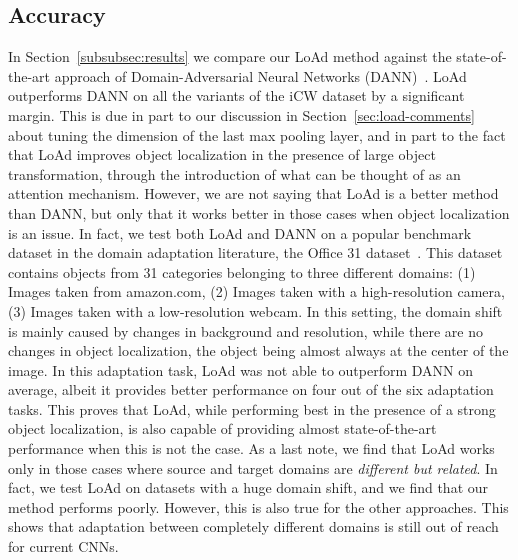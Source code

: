 \documentclass[../main.tex]{subfiles}
\begin{document}
    \subsection{Accuracy}
    In Section~\ref{subsubsec:results} we compare our LoAd method against the state-of-the-art approach of Domain-Adversarial
    Neural Networks (DANN)~\cite{DANN}. LoAd outperforms DANN on all the variants of the iCW dataset by a significant margin.
    This is due in part to our discussion in Section~\ref{sec:load-comments} about tuning the dimension of the last max pooling
    layer, and in part to the fact that LoAd improves object localization in the presence of large object transformation, through
    the introduction of what can be thought of as an attention mechanism. However, we are not saying that LoAd is a better method
    than DANN, but only that it works better in those cases when object localization is an issue. In fact, we test both LoAd and
    DANN on a popular benchmark dataset in the domain adaptation literature, the Office 31 dataset~\cite{office}. This dataset
	contains objects from 31 categories belonging to three different domains: (1) Images taken from amazon.com, (2) Images
	taken with a high-resolution camera, (3) Images taken with a low-resolution webcam. In this setting, the domain shift is
	mainly caused by changes in background and resolution, while there are no changes in object localization, the object being
	almost always at the center of the image. In this adaptation task, LoAd was not able to outperform DANN on average, albeit
	it provides better performance on four out of the six adaptation tasks. This proves that LoAd, while performing best in the
	presence of a strong object localization, is also capable of providing almost state-of-the-art performance when this is
	not the case. As a last note, we find that LoAd works only in those cases where source and target domains are
	\textit{different but related}. In fact, we test LoAd on datasets with a huge domain shift, and we find that our method
	performs poorly. However, this is also true for the other approaches. This shows that adaptation between completely
	different domains is still out of reach for current CNNs.
    
\end{document}
